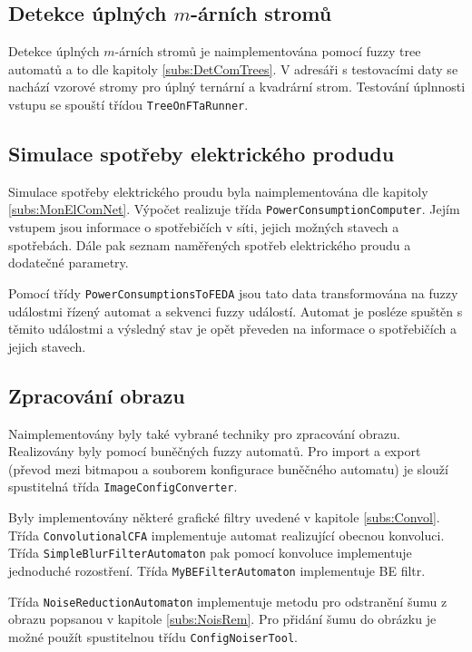 \documentclass[a4paper,10pt]{article}
\begin{document}
\subsection{Detekce úplných $m$-árních stromů}
Detekce úplných $m$-árních stromů je naimplementována pomocí fuzzy tree automatů a to dle kapitoly \ref{subs:DetComTrees}. V adresáři s testovacími daty se nachází vzorové stromy pro úplný ternární a kvadrární strom. Testování úplnnosti vstupu se spouští třídou \verb|TreeOnFTaRunner|.

\subsection{Simulace spotřeby elektrického produdu}
Simulace spotřeby elektrického proudu byla naimplementována dle kapitoly \ref{subs:MonElComNet}. Výpočet realizuje třída \verb|PowerConsumptionComputer|. Jejím vstupem jsou informace o spotřebičích v síti, jejich možných stavech a spotřebách. Dále pak seznam naměřených spotřeb elektrického proudu a dodatečné parametry. 

Pomocí třídy \verb|PowerConsumptionsToFEDA| jsou tato data transformována na fuzzy událostmi řízený automat a sekvenci fuzzy událostí. Automat je posléze spuštěn s těmito událostmi a výsledný stav je opět převeden na informace o spotřebičích a jejich stavech. 

\subsection{Zpracování obrazu}
Naimplementovány byly také vybrané techniky pro zpracování obrazu. Realizovány byly pomocí buněčných fuzzy automatů. Pro import a export (převod mezi bitmapou a souborem konfigurace buněčného automatu) je slouží spustitelná třída \verb|ImageConfigConverter|.

Byly implementovány některé grafické filtry uvedené v kapitole \ref{subs:Convol}. Třída \verb|ConvolutionalCFA| implementuje automat realizující obecnou konvoluci. Třída \verb|SimpleBlurFilterAutomaton| pak pomocí konvoluce implementuje jednoduché rozostření. Třída \verb|MyBEFilterAutomaton| implementuje BE filtr. 

Třída \verb|NoiseReductionAutomaton| implementuje metodu pro odstranění šumu z obrazu popsanou v kapitole \ref{subs:NoisRem}. Pro přidání šumu do obrázku je možné použít spustitelnou třídu \verb|ConfigNoiserTool|. 
\end{document}
